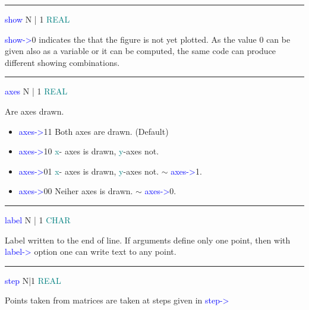 \vspace{0.3cm} 
\hrule 
\vspace{0.3cm} 
\noindent \textcolor{blue}{show} \tabto{3cm}  N | 1  \tabto{5cm}   \textcolor{teal}{REAL}  \tabto{7cm} 
\begin{changemargin}{3cm}{0cm} 
\noindent  \textcolor{blue}{show->}0 indicates the that the figure is not yet plotted. 
As the value 0 can be given also as a variable or it can be computed, 
the same code can produce different showing combinations. 
\end{changemargin} 
\vspace{0.3cm} 
\hrule 
\vspace{0.3cm} 
\noindent \textcolor{blue}{axes}  \tabto{3cm}  N | 1  \tabto{5cm}  \textcolor{teal}{REAL}  \tabto{7cm} 
\begin{changemargin}{3cm}{0cm} 
\noindent  Are axes drawn. 
\begin{itemize} 
\item \textcolor{blue}{axes->}11 Both axes are drawn. (Default) 
\item \textcolor{blue}{axes->}10 \textcolor{teal}{x}- axes is  drawn, \textcolor{teal}{y}-axes not. 
\item \textcolor{blue}{axes->}01 \textcolor{teal}{x}- axes is  drawn, \textcolor{teal}{y}-axes not. $\sim$ \textcolor{blue}{axes->}1. 
\item \textcolor{blue}{axes->}00 Neiher axes is drawn. $\sim$ \textcolor{blue}{axes->}0. 
\end{itemize} 
\end{changemargin} 
\vspace{0.3cm} 
\hrule 
\vspace{0.3cm} 
\noindent \textcolor{blue}{label}  \tabto{3cm}  N | 1  \tabto{5cm}   \textcolor{teal}{CHAR}  \tabto{7cm} 
\begin{changemargin}{3cm}{0cm} 
\noindent  Label written to the end of line. If arguments define only one point, 
then with \textcolor{blue}{label->} option one can write text to any point. 
\end{changemargin} 
\vspace{0.3cm} 
\hrule 
\vspace{0.3cm} 
\noindent \textcolor{blue}{step} \tabto{3cm} N|1 \tabto{5cm}  \textcolor{teal}{REAL} \tabto{7cm} 
\begin{changemargin}{3cm}{0cm} 
\noindent  Points taken from matrices are taken at steps given in \textcolor{blue}{step->} 
\end{changemargin} 
\vspace{0.3cm} 
